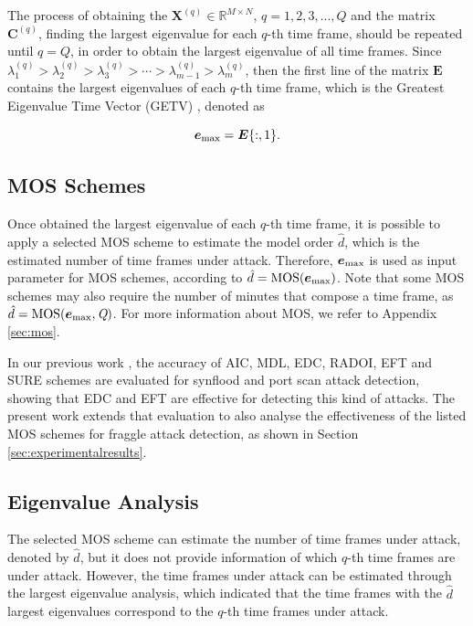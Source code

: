 \documentclass{bmcart}
\begin{document}
The process of obtaining the $\boldsymbol{X}^{(q)} \in \mathbb{R}^{M\times{N}}$, $q = 1, 2, 3, ..., Q$ and the matrix $\boldsymbol{C}^{(q)}$, finding the largest eigenvalue for each $q$-th time frame, should be repeated until $q = Q$, in order to obtain the largest eigenvalue of all time frames. Since $\lambda_1^{(q)} > \lambda_2^{(q)} > \lambda_3^{(q)} > \cdots > \lambda_{m-1}^{(q)} > \lambda_m^{(q)}$, then the first line of the matrix $\boldsymbol{E}$ contains the largest eigenvalues of each $q$-th time frame, which is the Greatest Eigenvalue Time
Vector (GETV) \cite{tenorio2013greatest}, denoted as 

\begin{equation}\label{eq:eq08}
\boldsymbol{e}_{\rm max} = \boldsymbol{E}\{:,1\}.
\end{equation}

\subsection{MOS Schemes}
\label{sec:prop_MOSSchemes}

Once obtained the largest eigenvalue of each $q$-th time frame, it is possible to apply a selected MOS scheme to estimate the model order $\hat{d}$, which is the estimated number of time frames under attack. Therefore, $\boldsymbol{e}_{\rm max}$ is used as input parameter for MOS schemes, according to $\hat{d} = \rm{MOS}(\boldsymbol{e}_{\rm max})$. Note that some MOS schemes may also require the number of minutes that compose a time frame, as $\hat{d} = \rm{MOS}(\boldsymbol{e}_{\rm max},\emph{Q})$. For more information about MOS, we refer to Appendix \ref{sec:mos}.

In our previous work \cite{tenorio2013greatest}, the accuracy of AIC, MDL, EDC, RADOI, EFT and SURE schemes are evaluated for synflood and port scan attack detection, showing that EDC and EFT are effective for detecting this kind of attacks. The present work extends that evaluation to also analyse the effectiveness of the listed MOS schemes for fraggle attack detection, as shown in Section \ref{sec:experimentalresults}.

\subsection{Eigenvalue Analysis}
\label{sec:prop_EigenvalueAnalysis}

The selected MOS scheme can estimate the number of time frames under attack, denoted by $\hat{d}$, but it does not provide information of which $q$-th time frames are under attack. However, the time frames under attack can be estimated through the largest eigenvalue analysis, which indicated that the time frames with the $\hat{d}$ largest eigenvalues correspond to the $q$-th time frames under attack.
\end{document}
